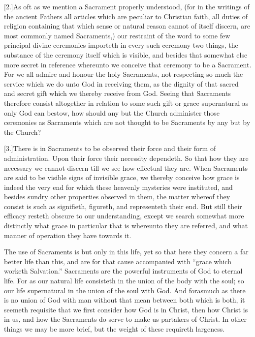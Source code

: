 [2.]As oft as we mention a Sacrament properly understood, (for in the writings of the ancient Fathers all articles which are peculiar to Christian faith, all duties of religion containing that which sense or natural reason cannot of itself discern, are most commonly named Sacraments,) our restraint of the word to some few principal divine ceremonies importeth in every such ceremony two things, the substance of the ceremony itself which is visible, and besides that somewhat else more secret in reference whereunto we conceive that ceremony to be a Sacrament. For we all admire and honour the holy Sacraments, not respecting so much the service which we do unto God in receiving them, as the dignity of that sacred and secret gift which we thereby receive from God. Seeing that Sacraments therefore consist altogether in relation to some such gift or grace supernatural as only God can bestow, how should any but the Church administer those ceremonies as Sacraments which are not thought to be Sacraments by any but by the Church?

[3.]There is in Sacraments to be observed their force and their form of administration. Upon their force their necessity dependeth. So that how they are necessary we cannot discern till we see how effectual they are. When Sacraments are said to be visible signs of invisible grace, we thereby conceive  how grace is indeed the very end for which these heavenly mysteries were instituted, and besides sundry other properties observed in them,
 the matter whereof they consist is such as signifieth, figureth, and representeth their end. But still their efficacy resteth obscure to our understanding, except we search somewhat more distinctly what grace in particular that is whereunto they are referred, and what manner of operation they have towards it.

The use of Sacraments is but only in this life, yet so that here they concern a far better life than this, and are for that cause accompanied with “grace which worketh Salvation.” Sacraments are the powerful instruments of God to eternal life. For as our natural life consisteth in the union of the body with the soul; so our life supernatural in the union of the soul with God. And forasmuch as there is no union of God with man without that mean between both which is both, it seemeth requisite that we first consider how God is in Christ, then how Christ is in us, and how the Sacraments do serve to make us partakers of Christ. In other things we may be more brief, but the weight of these requireth largeness.


